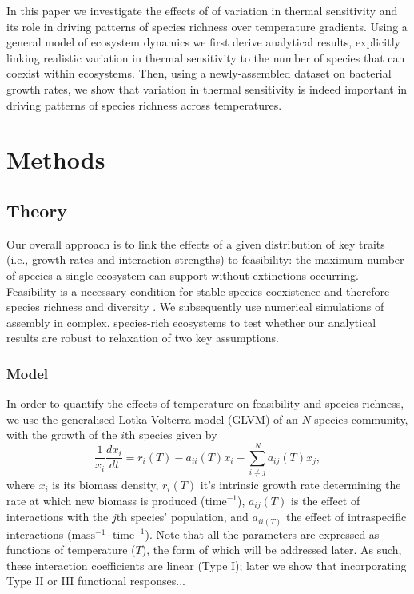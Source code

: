 \documentclass{article}
\begin{document}
 

In this paper we investigate the effects of of variation in thermal sensitivity and its role in driving patterns of species richness over temperature gradients. Using a general model of ecosystem dynamics we first derive analytical results, explicitly linking realistic variation in thermal sensitivity to the number of species that can coexist within ecosystems. Then, using a newly-assembled dataset on bacterial growth rates, we show that variation in thermal sensitivity is indeed important in driving patterns of species richness across temperatures.   

\section*{Methods}

\subsection*{Theory}

Our overall approach is to link the effects of a given distribution of key traits (i.e., growth rates and interaction strengths) to feasibility: the maximum number of species a single ecosystem can support without extinctions occurring. Feasibility is a necessary condition for stable species coexistence and therefore species richness and diversity \citep{Grilli2017,Dougoud2018}. We subsequently use numerical simulations of assembly in complex, species-rich ecosystems to test whether our analytical results are robust to relaxation of two key assumptions.

\subsubsection*{Model}
In order to quantify the effects of temperature on feasibility and species richness, we use the generalised Lotka-Volterra model (GLVM) of an $N$ species community, with the growth of the $i$th species given by
\begin{equation} \label{EQ:GLVM}
  \frac{1}{x_i} \frac{dx_i}{dt} = r_i(T) - a_{ii}(T) x_i - \sum^N_{i \neq j} a_{ij}(T) x_j, 
\end{equation}
where $x_i$ is its biomass density, $r_i(T)$ it's intrinsic growth rate determining the rate at which new biomass is produced ($\text{time}^{-1}$), $a_{ij}(T)$ is the effect of interactions with the $j$th species' population, and $a_{ii(T)}$ the effect of intraspecific interactions ($\text{mass}^{-1} \cdot \text{time}^{-1}$). Note that all the parameters are expressed as functions of temperature ($T$), the form of which will be addressed later. As such, these interaction coefficients are linear (Type I); later we show that incorporating Type II or III functional responses... 
\end{document}
